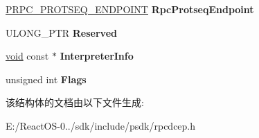 \begin{DoxyCompactItemize}
\hyperlink{struct___r_p_c___p_r_o_t_s_e_q___e_n_d_p_o_i_n_t}{P\+R\+P\+C\+\_\+\+P\+R\+O\+T\+S\+E\+Q\+\_\+\+E\+N\+D\+P\+O\+I\+NT} {\bfseries Rpc\+Protseq\+Endpoint}
\item 
\mbox{\label{struct___r_p_c___c_l_i_e_n_t___i_n_t_e_r_f_a_c_e_a362012910e5c5172ef6be7705604cb56}} 
U\+L\+O\+N\+G\+\_\+\+P\+TR {\bfseries Reserved}
\item 
\mbox{\label{struct___r_p_c___c_l_i_e_n_t___i_n_t_e_r_f_a_c_e_ad98e763c2b046882b9c046f524b31447}} 
\hyperlink{interfacevoid}{void} const  $\ast$ {\bfseries Interpreter\+Info}
\item 
\mbox{\label{struct___r_p_c___c_l_i_e_n_t___i_n_t_e_r_f_a_c_e_a58b6d2839f47ceedbd15ace2d4923843}} 
unsigned int {\bfseries Flags}
\end{DoxyCompactItemize}


该结构体的文档由以下文件生成\+:\begin{DoxyCompactItemize}
\item 
E\+:/\+React\+O\+S-\/0../sdk/include/psdk/rpcdcep.\+h\end{DoxyCompactItemize}
